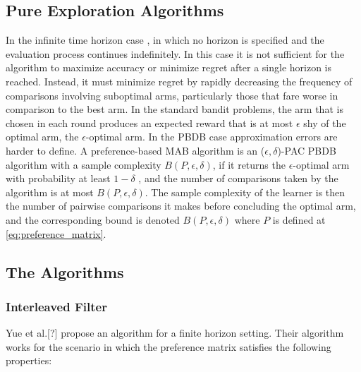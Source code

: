 \documentclass{llncs}
\begin{document}
	\subsection{Pure Exploration Algorithms}
	In the infinite time horizon case , in which no horizon is specified and the evaluation process continues indefinitely.
	In this case it is not sufficient for the algorithm to maximize accuracy or minimize regret after a single horizon is reached. 
	Instead, it must minimize regret by rapidly decreasing the frequency of comparisons involving suboptimal arms, particularly those that fare worse in comparison to the best arm.
	In the standard bandit problems, the arm that is chosen in each round produces an expected reward that is at most $\epsilon$ shy of the optimal arm, the $\epsilon$-optimal arm.
	In the PBDB case approximation errors are harder to define.  
	A preference-based MAB algorithm is an ($\epsilon, \delta$)-PAC PBDB algorithm with a sample complexity $B(P,\epsilon,\delta)$, if it returns the $\epsilon$-optimal arm with probability at least $1-\delta$ , and the number of comparisons taken by the algorithm is at most $B(P,\epsilon,\delta)$.
	The sample complexity of the learner is then the number of pairwise comparisons it makes before concluding the optimal arm, and the corresponding bound is denoted $B(P,\epsilon,\delta)$ where $P$ is defined at \eqref{eq:preference_matrix}.

	\subsection{The Algorithms}
\subsubsection{Interleaved Filter}
	Yue et al.[?] propose an algorithm for a finite horizon setting. 
	Their algorithm works for the scenario in which the preference matrix satisfies the following properties:
\end{document}
